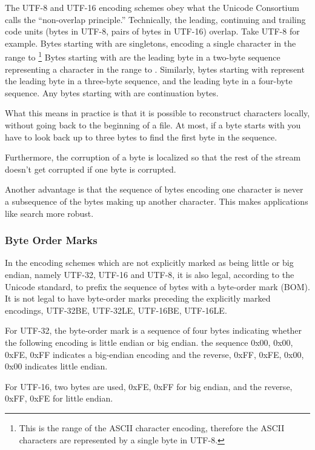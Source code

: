 The UTF-8 and UTF-16 encoding schemes obey what the Unicode Consortium
calls the ``non-overlap principle.''  Technically, the leading,
continuing and trailing code units (bytes in UTF-8, pairs of bytes in
UTF-16) overlap.  Take UTF-8 for example.  Bytes starting with
 are singletons, encoding a single character in the range 
 to %
%
\footnote{This is the range of the ASCII character encoding, therefore
the ASCII characters are represented by a single byte in UTF-8.}
%
Bytes starting with 
are the leading byte in a two-byte sequence representing a character
in the range  to .  Similarly, bytes
starting with  represent the leading byte in a three-byte
sequence, and  the leading byte in a four-byte sequence.
Any bytes starting with  are continuation bytes.

What this means in practice is that it is possible to reconstruct
characters locally, without going back to the beginning of a file.
At most, if a byte starts with  you have to look back
up to three bytes to find the first byte in the sequence.

Furthermore, the corruption of a byte is localized so that the rest of
the stream doesn't get corrupted if one byte is corrupted.

Another advantage is that the sequence of bytes encoding one character
is never a subsequence of the bytes making up another character.  This
makes applications like search more robust.


\subsubsection{Byte Order Marks}\label{section:byte-order-marks}

In the encoding schemes which are not explicitly marked as being
little or big endian, namely UTF-32, UTF-16 and UTF-8, it is also
legal, according to the Unicode standard, to prefix the sequence of
bytes with a byte-order mark (BOM).  It is not legal to have
byte-order marks preceding the explicitly marked encodings, UTF-32BE,
UTF-32LE, UTF-16BE, UTF-16LE.

For UTF-32, the byte-order mark is a sequence of four bytes indicating
whether the following encoding is little endian or big endian.  the
sequence 0x00, 0x00, 0xFE, 0xFF indicates a big-endian encoding and
the reverse, 0xFF, 0xFE, 0x00, 0x00 indicates little endian.

For UTF-16, two bytes are used, 0xFE, 0xFF for big endian, and the
reverse, 0xFF, 0xFE for little endian.

